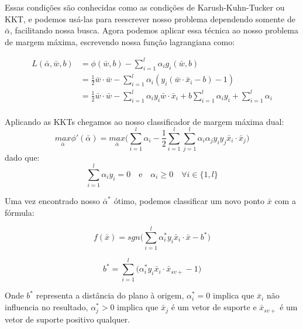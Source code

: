 Essas condições são conhecidas como as condições de Karush-Kuhn-Tucker ou KKT, e podemos usá-las para reescrever nosso problema dependendo somente de $\bar{\alpha}$, facilitando nossa busca. Agora podemos aplicar essa técnica ao nosso problema de margem máxima, escrevendo nossa função lagrangiana como:

\begin{equation}
\begin{split}
L(\bar{\alpha},\bar{w},b) &=\phi(\bar{w},b) -  \sum_{i=1}^{l}\alpha_i g_i (\bar{w},b) \\
 &=\frac{1}{2}\bar{w}\cdot\bar{w} - \sum_{i=1}^{l}\alpha_i (y_i(\bar{w}\cdot \bar{x}_i -b)-1) \\
 &=\frac{1}{2}\bar{w}\cdot\bar{w} - \sum_{i=1}^{l}\alpha_i y_i \bar{w}\cdot \bar{x}_i + b \sum_{i=1}^{l}\alpha_i y_i + \sum_{i=1}^{l}\alpha_i\\
\end{split}
\end{equation}

Aplicando as KKTs chegamos ao nosso classificador de margem máxima dual:
\begin{equation}
    \underset{\bar{\alpha}}{max} \phi' (\bar{\alpha}) = \underset{\bar{\alpha}}{max} \Bigg( \sum_{i=1}^{l}\alpha_i - \frac{1}{2}\sum_{i=1}^{l}\sum_{j=1}^{l}\alpha_i \alpha_j y_i y_j \bar{x}_i\cdot \bar{x}_j \Bigg)
    \label{eq:EQ_Treinador_1}
\end{equation}
dado que:
\begin{equation}
    \sum_{i=1}^{l}\alpha_i y_i = 0 \quad \text{e} \quad \alpha_i \ge 0 \quad \forall  i \in \{1,l\}
    \label{eq:restricoes}
\end{equation}

Uma vez encontrado nosso $\bar{\alpha}^*$ ótimo, podemos classificar um novo ponto $\bar{x}$ com a fórmula:

\begin{equation}
    f(\bar{x}) = sgn\Bigg(
        \sum_{i=1}^{l} \alpha_i^*y_i\bar{x}_i\cdot\bar{x}
        -b^*
    \Bigg)
    \label{eq:EQ_Classificador_1}
\end{equation}

\begin{equation}
    b^* = \sum_{i=1}^{l} 
    \Bigg(
        \alpha_i^*y_i\bar{x}_i\cdot\bar{x}_{sv+} -1
    \Bigg)
    \label{eq:EQ_B_1}
\end{equation}

Onde $b^*$ representa a distância do plano à origem, $\alpha_i^*=0$ implica que $\bar{x}_i$ não influencia no resultado, $\alpha_j^*> 0$ implica que $\bar{x}_j$ é um vetor de suporte e $\bar{x}_{sv+}$ é um vetor de suporte positivo qualquer.



